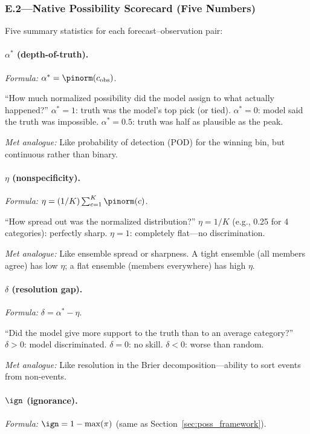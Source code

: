 \subsubsection{E.2---Native Possibility Scorecard (Five Numbers)}\label{sec:plain_e2}

Five summary statistics for each forecast--observation pair:

\paragraph{$\alpha^*$ (depth-of-truth).}
\textit{Formula:} $\alpha^* = \pinorm(c_{\mathrm{obs}})$.

``How much normalized possibility did the model assign to what actually happened?'' $\alpha^* = 1$: truth was the model's top pick (or tied). $\alpha^* = 0$: model said the truth was impossible. $\alpha^* = 0.5$: truth was half as plausible as the peak.

\textit{Met analogue:} Like probability of detection (POD) for the winning bin, but continuous rather than binary.

\paragraph{$\eta$ (nonspecificity).}
\textit{Formula:} $\eta = (1/K) \sum_{c=1}^{K} \pinorm(c)$.

``How spread out was the normalized distribution?'' $\eta = 1/K$ (e.g., 0.25 for 4 categories): perfectly sharp. $\eta = 1$: completely flat---no discrimination.

\textit{Met analogue:} Like ensemble spread or sharpness. A tight ensemble (all members agree) has low $\eta$; a flat ensemble (members everywhere) has high $\eta$.

\paragraph{$\delta$ (resolution gap).}
\textit{Formula:} $\delta = \alpha^* - \eta$.

``Did the model give more support to the truth than to an average category?'' $\delta > 0$: model discriminated. $\delta = 0$: no skill. $\delta < 0$: worse than random.

\textit{Met analogue:} Like resolution in the Brier decomposition---ability to sort events from non-events.

\paragraph{$\ign$ (ignorance).}
\textit{Formula:} $\ign = 1 - \max(\pi)$ (same as Section~\ref{sec:poss_framework}).

